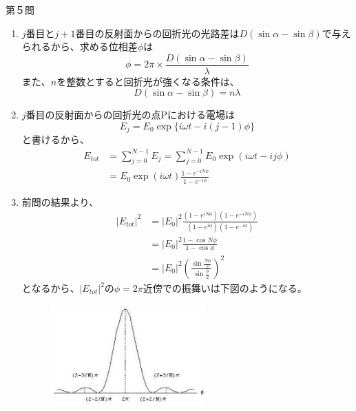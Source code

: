 \documentclass[fleqn]{jbook}
\begin{document}
\begin{answer}{第５問}{}
\begin{enumerate}

\item
$j$番目と$j+1$番目の反射面からの回折光の光路差は$D(\sin \alpha - \sin \beta)$で与えられるから、求める位相差$\phi$は
\begin{equation}
\phi =2\pi \times \frac{D(\sin \alpha - \sin \beta)}{\lambda}
\end{equation}
また、$n$を整数とすると回折光が強くなる条件は、
\begin{equation}
D(\sin \alpha - \sin \beta) =n\lambda
\end{equation}


\item
$j$番目の反射面からの回折光の点Pにおける電場は
\begin{equation}
E_j =E_0 \exp \{i\omega t-i(j-1)\phi \}
\end{equation}
と書けるから、
\begin{equation}
\begin{split}
E_{tot}&=\sum ^{N-1}_{j=0}E_j =\sum ^{N-1}_{j=0}E_0 \exp (i\omega t -ij\phi) \\
       &=E_0 \exp (i\omega t)\frac{1-e^{-iN\phi}}{1-e^{-i\phi}}
\end{split}
\end{equation}




\item
前問の結果より、
\begin{equation}
\begin{split}
|E_{tot}|^2&=|E_0|^2 
\frac{(1-e^{iN\phi})(1-e^{-iN\phi})}{(1-e^{i\phi})(1-e^{-i\phi})} \\
         &=|E_0|^2\frac{1-\cos N\phi }{1-\cos \phi} \\
         &=|E_0|^2\left(\frac{\sin \frac{N\phi}{2}}{\sin \frac{\phi}{2}}\right)^2
\end{split}
\end{equation}
となるから、$|E_{tot}|^2$の$\phi =2\pi$近傍での振舞いは下図のようになる。

\begin{figure}[h]
\begin{center}
\includegraphics[width=6.0cm,clip]{2004phy5-1.eps}
\caption{}
\end{center}
\end{figure}


\end{enumerate}
\end{answer}
\end{document}
